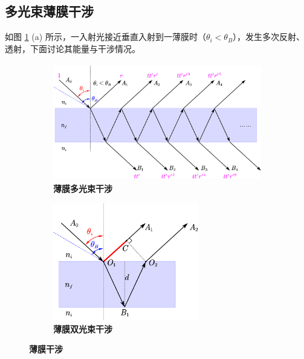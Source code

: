 \documentclass[UTF8]{report}
\theoremstyle{MyLineTheoremStyle} %
\theoremstyle{MyBlockTheoremStyle} %
\theoremstyle{MySubsubsectionStyle} %
\begin{document}
\subsection{多光束薄膜干涉}




如图 \ref{薄膜干涉} (a) 所示，一入射光接近垂直入射到一薄膜时（$\theta_i < \theta_B$），发生多次反射、透射，下面讨论其能量与干涉情况。

\begin{figure}[H]\centering
    \begin{subfigure}[t]{0.6\columnwidth}\centering
        \includegraphics[height=145pt]{assets/3/薄膜干涉.pdf}
        \caption{\bfseries 薄膜多光束干涉 }
    \end{subfigure}\hfill
    \begin{subfigure}[t]{0.4\columnwidth}\centering
        \includegraphics[height=145pt]{assets/3/薄膜双光束干涉.pdf}
        \caption{\bfseries 薄膜双光束干涉 }
    \end{subfigure}
    \caption{\bfseries 薄膜干涉 }\label{薄膜干涉}
\end{figure}
\end{document}
